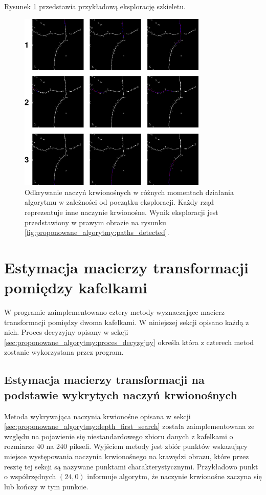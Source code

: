 Rysunek \ref{fig:proponowane_algorytmy:path_explor} przedstawia przykładową eksplorację szkieletu.

\begin{figure}[htb]
  \centering
  \includegraphics[width=9cm]{gfx/path_explor}
  \caption{Odkrywanie naczyń krwionośnych w różnych momentach działania algorytmu w zależności od początku eksploracji. Każdy rząd reprezentuje inne naczynie krwionośne. Wynik eksploracji jest przedstawiony w prawym obrazie na rysunku \ref{fig:proponowane_algorytmy:paths_detected}.}
  \label{fig:proponowane_algorytmy:path_explor}
\end{figure}

\section{Estymacja macierzy transformacji pomiędzy kafelkami}
\label{sec:proponowane_algorytmy:estymacja}

W programie zaimplementowano cztery metody wyznaczające macierz transformacji pomiędzy dwoma kafelkami. W niniejszej sekcji opisano każdą z nich. Proces decyzyjny opisany w sekcji \ref{sec:proponowane_algorytmy:proces_decyzyjny} określa która z czterech metod zostanie wykorzystana przez program.

\subsection{Estymacja macierzy transformacji na podstawie wykrytych naczyń krwionośnych}
\label{sec:proponowane_algorytmy:use_paths}

Metoda wykrywająca naczynia krwionośne opisana w sekcji \ref{sec:proponowane_algorytmy:depth_first_search} została zaimplementowana ze względu na pojawienie się niestandardowego zbioru danych z kafelkami o rozmiarze 40 na 240 pikseli. Wyjściem metody jest zbiór punktów wskazujący miejsce występowania naczynia krwionośnego na krawędzi obrazu, które przez resztę tej sekcji są nazywane punktami charakterystycznymi. Przykładowo punkt o współrzędnych $(24, 0)$ informuje algorytm, że naczynie krwionośne zaczyna się lub kończy w tym punkcie.

